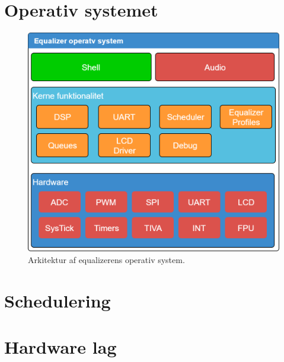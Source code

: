 \section{Operativ systemet}

\begin{figure}[h!]
	\centering
	\includegraphics[width=.8\textwidth]{billeder/eq_os.png}
	\caption{Arkitektur af equalizerens operativ system.}
	\label{fig:eq_os}
\end{figure}
\FloatBlock


\section{Schedulering}




\section{Hardware lag}



